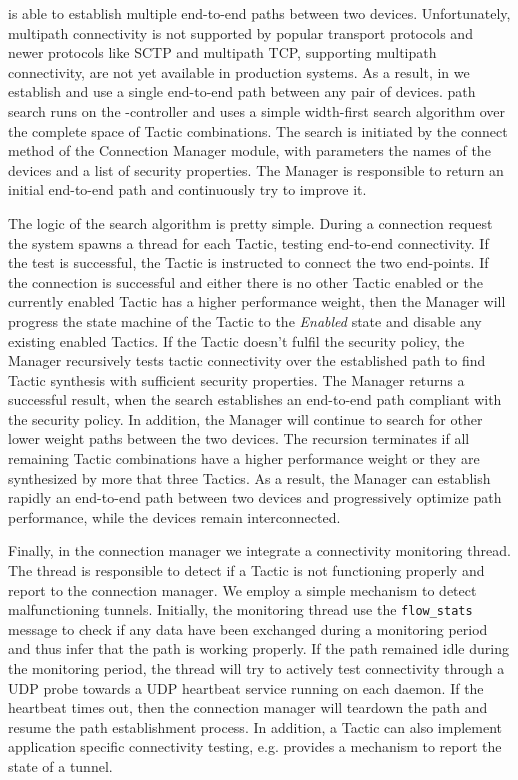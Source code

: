 \signpost is able to establish multiple end-to-end paths between two devices.
Unfortunately, multipath connectivity is not supported by popular transport
protocols and newer protocols like SCTP and multipath TCP, supporting multipath
connectivity, are not yet available in production systems.  As a result,  in
\signpost we establish and use a single end-to-end path between any pair of
devices.  \signpost path search runs on the \signpost-controller and uses a
simple width-first search algorithm over the complete space of  Tactic
combinations. The search is initiated by the connect method of the Connection
Manager module, with parameters the names of the devices and a list of security
properties. The Manager is responsible to return an initial end-to-end path and
continuously try to improve it. 

The logic of the search algorithm is pretty simple. During a connection request
the system spawns a thread for each Tactic, testing end-to-end connectivity.  If
the test is successful, the Tactic is instructed to connect the two end-points.
If the connection is successful and either there is no other Tactic enabled or
the currently enabled Tactic has a higher performance weight, then the Manager
will progress the state machine of the Tactic to the {\it Enabled}\/ state and
disable any existing enabled Tactics. If the Tactic doesn't fulfil the security
policy, the Manager recursively tests tactic connectivity over the established
path to find Tactic synthesis with sufficient security properties. The Manager
returns a successful result, when the search establishes an end-to-end path
compliant with the security policy.  In addition, the Manager will continue to
search for other lower weight paths between the two devices.  The recursion
terminates if all remaining Tactic combinations have a higher performance weight
or they are synthesized by more that three Tactics. As a result, the Manager can
establish rapidly an end-to-end path between two devices and progressively
optimize path performance, while the devices remain interconnected. 

Finally, in the connection manager we integrate a connectivity monitoring
thread. The thread is responsible to detect if a Tactic is not functioning
properly and report to the connection manager. We employ a simple mechanism to
detect malfunctioning tunnels. Initially, the monitoring thread use the
\texttt{flow\_stats} \of message to check if any data have been exchanged during
a monitoring period and thus infer that the path is working properly. If the
path remained idle during the monitoring period, the thread will try to actively 
test connectivity  through a UDP probe towards a UDP heartbeat service running
on each \signpost daemon. If the heartbeat times out, then the connection
manager will teardown the path and resume the path establishment process. In
addition, a Tactic can also implement application specific connectivity testing,
e.g. \openvpn provides a mechanism to report the state of a tunnel. 

